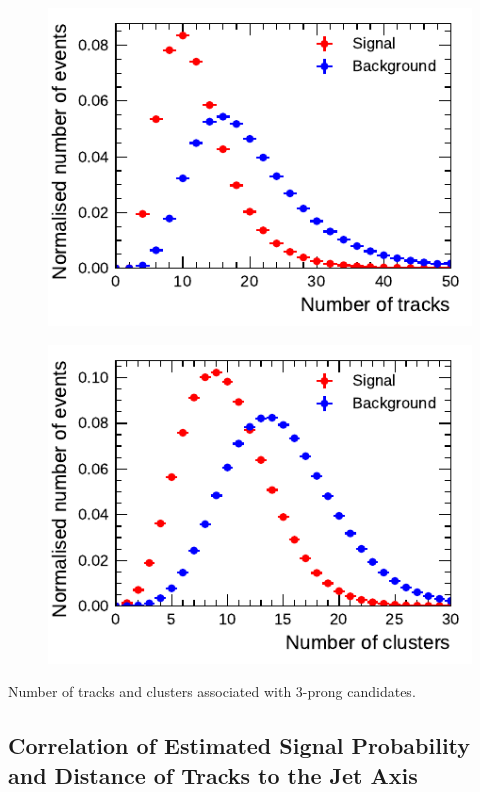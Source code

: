 \noindent
\begin{minipage}{\textwidth}
  \captionsetup{type=figure}
  \begin{subfigure}[t]{0.48\textwidth}
    \centering
    \includegraphics{./figures/rnn/ntrk_3p.pdf}
  \end{subfigure}\hfill
  \begin{subfigure}[t]{0.48\textwidth}
    \centering
    \includegraphics{./figures/rnn/ncls_3p.pdf}
  \end{subfigure}
  \caption{Number of tracks and clusters associated with 3-prong \tauhadvis
    candidates.}
\end{minipage}

\subsection{Correlation of Estimated Signal Probability and Distance of Tracks
  to the Jet Axis}
\label{app:corr_dr}

